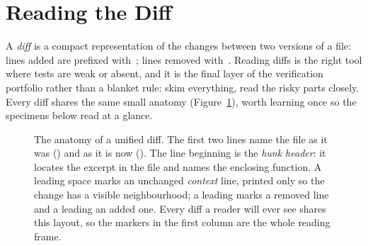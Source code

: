 \section{Reading the Diff}
\label{section:ReadingDiff}

A \emph{diff} is a compact representation of the changes between two versions of a file: lines added are prefixed with~\code{+}; lines removed with~\code{-}.
Reading diffs is the right tool where tests are weak or absent, and it is the final layer of the verification portfolio rather than a blanket rule: skim everything, read the risky parts closely.
Every diff shares the same small anatomy (Figure~\ref{figure:DiffAnatomy}), worth learning once so the specimens below read at a glance.

\begin{figure}[htb!]
\begin{center}

\caption{The anatomy of a unified diff.
The first two lines name the file as it was () and as it is now ().
The line beginning  is the \emph{hunk header}: it locates the excerpt in the file and names the enclosing function.
A leading space marks an unchanged \emph{context} line, printed only so the change has a visible neighbourhood; a leading \code{-} marks a removed line and a leading \code{+} an added one.
Every diff a reader will ever see shares this layout, so the markers in the first column are the whole reading frame.}
\label{figure:DiffAnatomy}
\end{center}
\end{figure}

